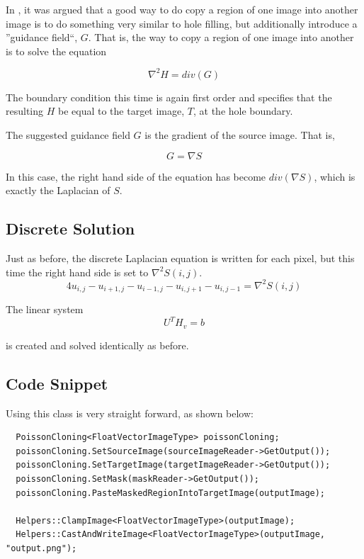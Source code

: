 \documentclass{InsightArticle}
\begin{document}
In \cite{PoissonImageEditing}, it was argued that a good way to do copy a region of one image into another image is to do something very similar to hole filling, but additionally introduce a ''guidance field``, $G$. That is, the way to copy a region of one image into another is to solve the equation

\begin{equation}
\nabla^2 H = div(G)
\end{equation}

The boundary condition this time is again first order and specifies that the resulting $H$ be equal to the target image, $T$, at the hole boundary.

The suggested guidance field $G$ is the gradient of the source image. That is,

\begin{equation}
G = \nabla S
\end{equation}

In this case, the right hand side of the equation has become $div(\nabla S)$, which is exactly the Laplacian of $S$.

\subsection{Discrete Solution}
Just as before, the discrete Laplacian equation is written for each pixel, but this time the right hand side is set to $\nabla^2 S(i,j)$.
\begin{equation}
\label{eqn:DiscreteLaplacian}
4 u_{i,j} - u_{i+1,j} - u_{i-1,j} - u_{i,j+1} - u_{i,j-1} = \nabla^2 S(i,j)
\end{equation}

The linear system 
\begin{equation}
 U^T H_v = b
\end{equation}

is created and solved identically as before.

\subsection{Code Snippet}

Using this class is very straight forward, as shown below:

\begin{verbatim}
  PoissonCloning<FloatVectorImageType> poissonCloning;
  poissonCloning.SetSourceImage(sourceImageReader->GetOutput());
  poissonCloning.SetTargetImage(targetImageReader->GetOutput());
  poissonCloning.SetMask(maskReader->GetOutput());
  poissonCloning.PasteMaskedRegionIntoTargetImage(outputImage);

  Helpers::ClampImage<FloatVectorImageType>(outputImage);
  Helpers::CastAndWriteImage<FloatVectorImageType>(outputImage, "output.png");
\end{verbatim}
\end{document}
